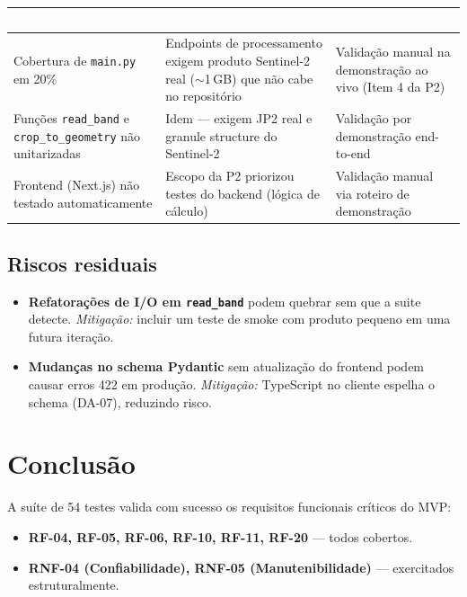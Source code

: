 \documentclass[11pt, a4paper]{article}
\begin{document}
\renewcommand{\arraystretch}{1.4}
\begin{table}[H]
\centering
\small
{}
\begin{tabularx}{\textwidth}{@{}XXX@{}}
\toprule
\rowcolor{tabheader}\textcolor{white}{\textbf{Limitação}} & \textcolor{white}{\textbf{Justificativa}} & \textcolor{white}{\textbf{Mitigação}}\\
\midrule
Cobertura de \texttt{main.py} em 20\% & Endpoints de processamento exigem produto Sentinel-2 real ($\sim$1\,GB) que não cabe no repositório & Validação manual na demonstração ao vivo (Item 4 da P2)\\
Funções \texttt{read\_band} e \texttt{crop\_to\_geometry} não unitarizadas & Idem --- exigem JP2 real e granule structure do Sentinel-2 & Validação por demonstração end-to-end\\
Frontend (Next.js) não testado automaticamente & Escopo da P2 priorizou testes do backend (lógica de cálculo) & Validação manual via roteiro de demonstração\\
\bottomrule
\end{tabularx}
\end{table}

\subsection{Riscos residuais}

\begin{itemize}
  \item \textbf{Refatorações de I/O em \texttt{read\_band}} podem quebrar sem que a suite detecte. \textit{Mitigação:} incluir um teste de smoke com produto pequeno em uma futura iteração.
  \item \textbf{Mudanças no schema Pydantic} sem atualização do frontend podem causar erros 422 em produção. \textit{Mitigação:} TypeScript no cliente espelha o schema (DA-07), reduzindo risco.
\end{itemize}

\section{Conclusão}

A suíte de 54 testes valida com sucesso os requisitos funcionais críticos do MVP:

\begin{itemize}
  \item \textbf{RF-04, RF-05, RF-06, RF-10, RF-11, RF-20} --- todos cobertos.
  \item \textbf{RNF-04 (Confiabilidade), RNF-05 (Manutenibilidade)} --- exercitados estruturalmente.
\end{itemize}
\end{document}
